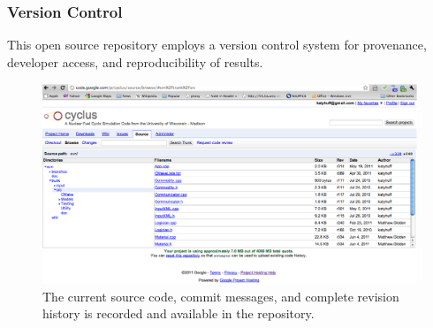 \begin{frame}[ctb!]
  \frametitle{Version Control}
    This open source repository employs a version control system 
     for provenance, developer access, and reproducibility of results.
  \begin{figure}[htbp!]
    \begin{center}
      \includegraphics[height=6cm]{source.eps}
    \end{center}
    \caption{The current source code, commit messages, and complete 
    revision history is recorded and available in the repository.}
    \label{fig:source}
  \end{figure}
\end{frame}
